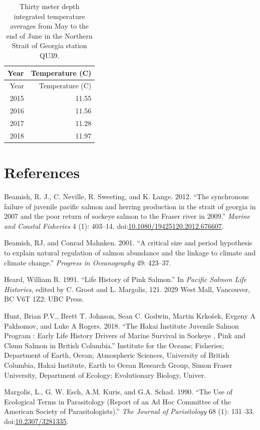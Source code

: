 \documentclass[fleqn,10pt]{wlpeerj} %
\begin{document}
\begin{longtable}[]{@{}rr@{}}
\caption{\label{tab:ssttable} Thirty meter depth integrated temperature
averages from May to the end of June in the Northern Strait of Georgia
station QU39.}\tabularnewline
\toprule
Year & Temperature (C)\tabularnewline
\midrule
\endfirsthead
\toprule
Year & Temperature (C)\tabularnewline
\midrule
\endhead
2015 & 11.55\tabularnewline
2016 & 11.56\tabularnewline
2017 & 11.28\tabularnewline
2018 & 11.97\tabularnewline
\bottomrule
\end{longtable}

\section*{References}\label{references}

\hypertarget{refs}{}
\hypertarget{ref-Beamish2012}{}
Beamish, R. J., C. Neville, R. Sweeting, and K. Lange. 2012. ``The
synchronous failure of juvenile pacific salmon and herring production in
the strait of georgia in 2007 and the poor return of sockeye salmon to
the Fraser river in 2009.'' \emph{Marine and Coastal Fisheries} 4 (1):
403--14.
doi:\href{https://doi.org/10.1080/19425120.2012.676607}{10.1080/19425120.2012.676607}.

\hypertarget{ref-Beamish2001}{}
Beamish, RJ, and Conrad Mahnken. 2001. ``A critical size and period
hypothesis to explain natural regulation of salmon abundance and the
linkage to climate and climate change.'' \emph{Progress in Oceanography}
49: 423--37.

\hypertarget{ref-Heard1991}{}
Heard, William R. 1991. ``Life History of Pink Salmon.'' In
\emph{Pacific Salmon Life Histories}, edited by C. Groot and L.
Margolis, 121. 2029 West Mall, Vancouver, BC V6T 1Z2: UBC Press.

\hypertarget{ref-Hunt2018}{}
Hunt, Brian P.V., Brett T. Johnson, Sean C. Godwin, Martin Krkošek,
Evgeny A Pakhomov, and Luke A Rogers. 2018. ``The Hakai Institute
Juvenile Salmon Program : Early Life History Drivers of Marine Survival
in Sockeye , Pink and Chum Salmon in British Columbia.'' Institute for
the Oceans; Fisheries; Department of Earth, Ocean; Atmospheric Sciences,
University of British Columbia, Hakai Institute, Earth to Ocean Research
Group, Simon Fraser University, Department of Ecology; Evolutionary
Biology, Univer.

\hypertarget{ref-Margolis1990}{}
Margolis, L., G. W. Esch, A.M. Kuris, and G.A. Schad. 1990. ``The Use of
Ecological Terms in Parasitology (Report of an Ad Hoc Committee of the
American Society of Parasitologists).'' \emph{The Journal of
Parisitology} 68 (1): 131--33.
doi:\href{https://doi.org/10.2307/3281335}{10.2307/3281335}.
\end{document}
